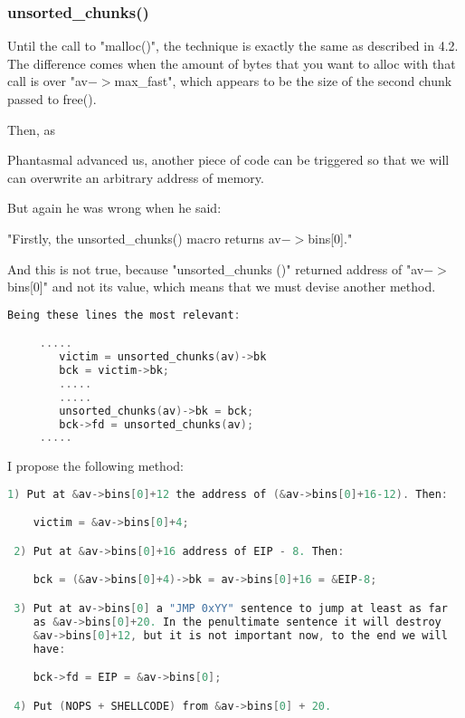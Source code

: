 \documentclass[12pt]{article}
\begin{document}
\subsubsection{unsorted\_chunks()}

	
Until the call to "malloc()", the technique is exactly the same as
described in 4.2. The difference comes when the amount of bytes that you
want to alloc with that call is over "av$->$max\_fast", which appears to be
the size of the second chunk passed to free().

Then, as\newline

 Phantasmal advanced us, another piece of code can be triggered so
that we will can overwrite an arbitrary address of memory.

But again he was wrong when he said:
\newline

\begin{verbnobox}[\small]
   "Firstly, the unsorted\_chunks() macro returns av$->$bins[0]."
\end{verbnobox}


And this is not true, because "unsorted\_chunks ()" returned address of
"av$->$bins[0]" and not its value, which means that we must devise another
method.

\begin{lstlisting}[language=C]
Being these lines the most relevant:

     .....
        victim = unsorted_chunks(av)->bk
        bck = victim->bk;
        .....
        .....
        unsorted_chunks(av)->bk = bck;
        bck->fd = unsorted_chunks(av);
     .....
\end{lstlisting}

I propose the following method:

\begin{lstlisting}[language=C]
 1) Put at &av->bins[0]+12 the address of (&av->bins[0]+16-12). Then:

    victim = &av->bins[0]+4;

 2) Put at &av->bins[0]+16 address of EIP - 8. Then:

    bck = (&av->bins[0]+4)->bk = av->bins[0]+16 = &EIP-8;

 3) Put at av->bins[0] a "JMP 0xYY" sentence to jump at least as far
    as &av->bins[0]+20. In the penultimate sentence it will destroy
    &av->bins[0]+12, but it is not important now, to the end we will
    have:

    bck->fd = EIP = &av->bins[0];

 4) Put (NOPS + SHELLCODE) from &av->bins[0] + 20.
\end{lstlisting}
 	
\end{document}
